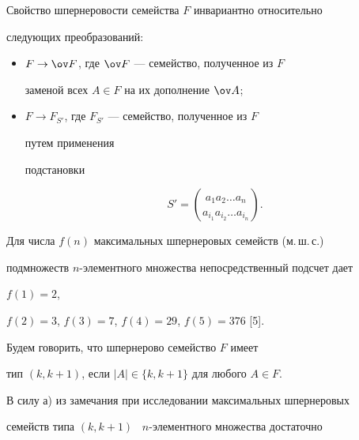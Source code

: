  


 


\begin{notenonum} 


Свойство шпернеровости семейства $F$ инвариантно относительно 


следующих преобразований: 


\begin{itemize} 


\item[a)] $F\to\ov F$, где $\ov F$ --- семейство, полученное из $F$ 


заменой всех $A\in F$ на их дополнение $\ov A$; 


\item[б)] $F\to F_{S'}$, где $F_{S'}$ --- семейство, полученное из $F$ 


путем применения 


подстановки 


$$ 


S'=\binom{a_1a_2\dotsc a_n}{a_{i_1}a_{i_2}\dotsc a_{i_n}}. 


$$ 


\end{itemize} 


\end{notenonum} 


 


Для числа $f(n)$ максимальных шпернеровых семейств (м.\,ш.\,с.) 


подмножеств $n$-элементного множества непосредственный подсчет дает 


$f(1)=2$, 


$f(2)=3$, $f(3)=7$, $f(4)=29$, $f(5)=376$ [5]. 


 


 


\begin{defn} 


Будем говорить, что шпернерово семейство $F$ имеет 


тип $(k,k+1)$, если $|A|\in\{k,k+1\}$ для любого $A\in F$. 


\end{defn} 


 


В силу а) из замечания при исследовании максимальных шпернеровых 


семейств типа $(k,k+1)$ \ $n$-элементного множества достаточно 


